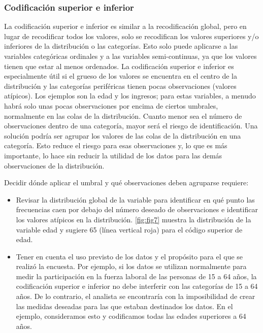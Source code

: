 \documentclass[
]{book}
\providecommand{\tightlist}{%
  \setlength{\itemsep}{0pt}\setlength{\parskip}{0pt}}
\theoremstyle{definition}
\theoremstyle{definition}
\theoremstyle{definition}
\theoremstyle{definition}
\theoremstyle{remark}
\begin{document}
\hypertarget{cod-sup-inf}{%
\subsubsection{Codificación superior e inferior}\label{cod-sup-inf}}

La codificación superior e inferior es similar a la recodificación global, pero en lugar de recodificar todos los valores, solo se recodifican los valores superiores y/o inferiores de la distribución o las categorías. Esto solo puede aplicarse a las variables categóricas ordinales y a las variables semi-continuas, ya que los valores tienen que estar al menos ordenados. La codificación superior e inferior es especialmente útil si el grueso de los valores se encuentra en el centro de la distribución y las categorías periféricas tienen pocas observaciones (valores atípicos). Los ejemplos son la edad y los ingresos; para estas variables, a menudo habrá solo unas pocas observaciones por encima de ciertos umbrales, normalmente en las colas de la distribución. Cuanto menor sea el número de observaciones dentro de una categoría, mayor será el riesgo de identificación. Una solución podría ser agrupar los valores de las colas de la distribución en una categoría. Esto reduce el riesgo para esas observaciones y, lo que es más importante, lo hace sin reducir la utilidad de los datos para las demás observaciones de la distribución.

Decidir dónde aplicar el umbral y qué observaciones deben agruparse requiere:

\begin{itemize}
\tightlist
\item
  Revisar la distribución global de la variable para identificar en qué punto las frecuencias caen por debajo del número deseado de observaciones e identificar los valores atípicos en la distribución. \ref{fig:fig7} muestra la distribución de la variable edad y sugiere 65 (línea vertical roja) para el código superior de edad.
\item
  Tener en cuenta el uso previsto de los datos y el propósito para el que se realizó la encuesta. Por ejemplo, si los datos se utilizan normalmente para medir la participación en la fuerza laboral de las personas de 15 a 64 años, la codificación superior e inferior no debe interferir con las categorías de 15 a 64 años. De lo contrario, el analista se encontraría con la imposibilidad de crear las medidas deseadas para las que estaban destinados los datos. En el ejemplo, consideramos esto y codificamos todas las edades superiores a 64 años.
\end{itemize}
\end{document}
